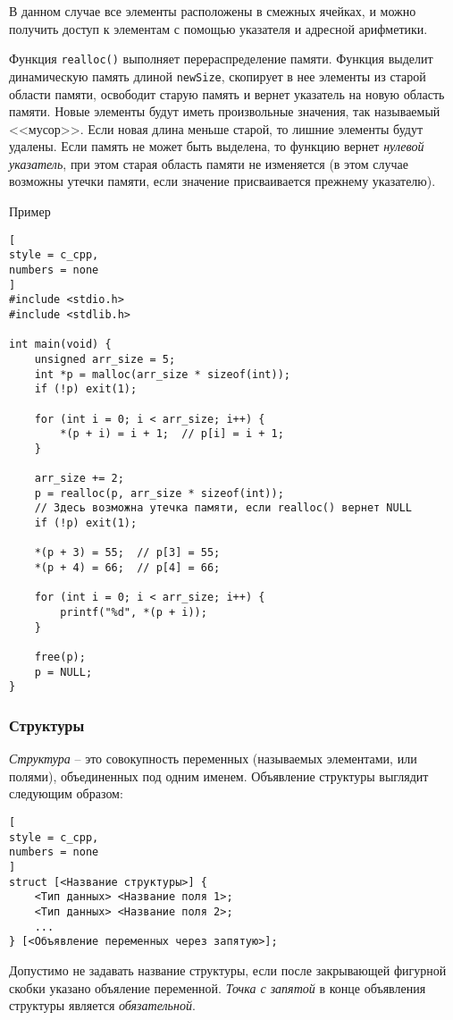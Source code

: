 \documentclass[%
	11pt,
	a4paper,
	utf8,
		]{article}
\begin{document}
В данном случае все элементы расположены в смежных ячейках, и можно получить доступ к элементам с помощью указателя и адресной арифметики. 

Функция \verb|realloc()| выполняет перераспределение памяти. Функция выделит динамическую память длиной \verb*|newSize|, скопирует в нее элементы из старой области памяти, освободит старую память и вернет указатель на новую область памяти. Новые элементы будут иметь произвольные значения, так называемый <<мусор>>. Если новая длина меньше старой, то лишние элементы будут удалены. Если память не может быть выделена, то функцию вернет \emph{нулевой указатель}, при этом старая область памяти не изменяется (в этом случае возможны утечки памяти, если значение присваивается прежнему указателю).

Пример
\begin{lstlisting}[
style = c_cpp,
numbers = none
]
#include <stdio.h>
#include <stdlib.h>

int main(void) {
    unsigned arr_size = 5;
    int *p = malloc(arr_size * sizeof(int));
    if (!p) exit(1);
    
    for (int i = 0; i < arr_size; i++) {
        *(p + i) = i + 1;  // p[i] = i + 1;
    }
    
    arr_size += 2;
    p = realloc(p, arr_size * sizeof(int));
    // Здесь возможна утечка памяти, если realloc() вернет NULL
    if (!p) exit(1);
    
    *(p + 3) = 55;  // p[3] = 55;
    *(p + 4) = 66;  // p[4] = 66;
    
    for (int i = 0; i < arr_size; i++) {
        printf("%d", *(p + i));
    }
    
    free(p);
    p = NULL;
}
\end{lstlisting}

\subsubsection{Структуры}

\emph{Структура} -- это совокупность переменных (называемых элементами, или полями), объединенных под одним именем. Объявление структуры выглядит следующим образом:
\begin{lstlisting}[
style = c_cpp,
numbers = none
]
struct [<Название структуры>] {
    <Тип данных> <Название поля 1>;
    <Тип данных> <Название поля 2>;
    ...
} [<Объявление переменных через запятую>];
\end{lstlisting}

Допустимо не задавать название структуры, если после закрывающей фигурной скобки указано объяление переменной. \emph{Точка с запятой} в конце объявления структуры является \emph{обязательной}.
\end{document}
